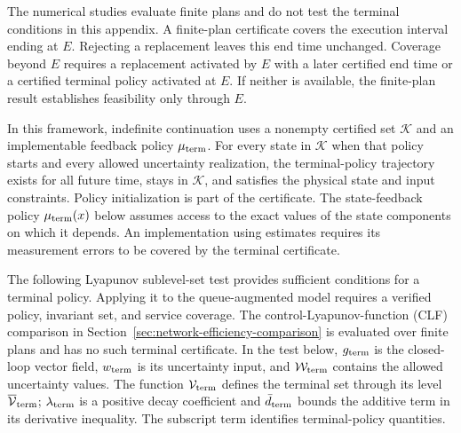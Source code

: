 \documentclass[final]{cas-sc}
\theoremstyle{definition}
\theoremstyle{plain}
\theoremstyle{definition}
\theoremstyle{plain}
\begin{document}
The numerical studies evaluate finite plans and do not test the terminal
conditions in this appendix. A finite-plan certificate covers the execution interval ending at $E$.
Rejecting a replacement leaves this end time unchanged. Coverage beyond $E$
requires a replacement
activated by $E$ with a later certified end time or a certified terminal policy activated at $E$. If neither is available, the finite-plan result
establishes feasibility only through $E$.

In this framework, indefinite continuation uses a nonempty certified set
$\mathcal K$ and an implementable feedback policy $\mu_{\rm term}$. For every
state in $\mathcal K$ when that policy starts and every allowed uncertainty realization,
the terminal-policy trajectory exists for all future time, stays in $\mathcal K$,
and satisfies the physical state and input constraints. Policy
initialization is part of the certificate. The state-feedback policy
$\mu_{\rm term}(x)$ below assumes access to the exact values of the state components
on which it depends. An implementation using estimates requires its
measurement errors to be covered by the terminal certificate.

The following Lyapunov sublevel-set test \cite{khalil2002nonlinear}
provides sufficient conditions for a terminal policy. Applying it to the
queue-augmented model requires a verified policy, invariant set, and
service coverage. The control-Lyapunov-function (CLF) comparison in
Section~\ref{sec:network-efficiency-comparison} is evaluated over finite plans and has
no such terminal certificate. In the test below, $g_{\rm term}$ is the
closed-loop vector field, $w_{\rm term}$ is its uncertainty input, and
$\mathcal W_{\rm term}$ contains the allowed uncertainty values. The
function $\mathcal V_{\rm term}$ defines the terminal set through its
level $\overline{\mathcal V}_{\rm term}$; $\lambda_{\rm term}$ is a
positive decay coefficient and $\bar d_{\rm term}$ bounds the additive
term in its derivative inequality. The subscript $\mathrm{term}$
identifies terminal-policy quantities.
\end{document}
